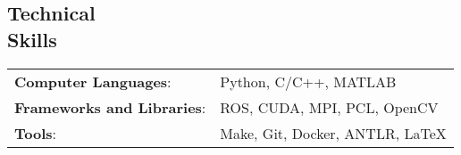 \documentclass[margin,line,pifont,palatino,courier]{res}
\newenvironment{list1}{
	\begin{list}{\ding{113}}{%
			\setlength{\itemsep}{0in}
			\setlength{\parsep}{0in} \setlength{\parskip}{0in}
			\setlength{\topsep}{0in} \setlength{\partopsep}{0in}
			\setlength{\leftmargin}{0.17in}}}{\end{list}}
\begin{document}
\begin{resume}
		\section{\sc Technical\\Skills}
		\vspace*{.02in}
		\begin{tabular}{@{}p{2.2in}p{3in}}
			{\bf Computer Languages}: & Python, C/C++, MATLAB  \\
			{\bf Frameworks and Libraries}: & ROS, CUDA, MPI, PCL, OpenCV\\
			{\bf Tools}: & Make, Git, Docker, ANTLR, \LaTeX
		\end{tabular}
		

%
%	


\end{resume}
\end{document}
